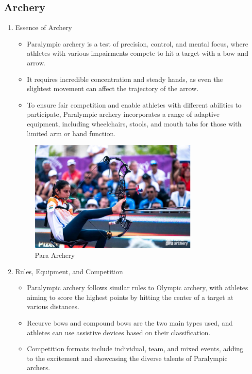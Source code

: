 \subsection{Archery}

\begin{enumerate}

\item Essence of Archery
    \begin{itemize}
    \item Paralympic archery is a test of precision, control, and mental focus, where athletes with various impairments compete to hit a target with a bow and arrow. 
    \item It requires incredible concentration and steady hands, as even the slightest movement can affect the trajectory of the arrow. 
    \item To ensure fair competition and enable athletes with different abilities to participate, Paralympic archery incorporates a range of adaptive equipment, including wheelchairs, stools, and mouth tabs for those with limited arm or hand function.
    \end{itemize}

\begin{figure}[htbp] %
\centering
\includegraphics[width=0.8\textwidth]{Images/para_archery.jpg}
\caption{Para Archery}
\label{fig:my_image}
\end{figure}

\item Rules, Equipment, and Competition
    \begin{itemize}
    \item Paralympic archery follows similar rules to Olympic archery, with athletes aiming to score the highest points by hitting the center of a target at various distances. 
    \item Recurve bows and compound bows are the two main types used, and athletes can use assistive devices based on their classification. 
    \item Competition formats include individual, team, and mixed events, adding to the excitement and showcasing the diverse talents of Paralympic archers.
    \end{itemize}


\end{enumerate}
